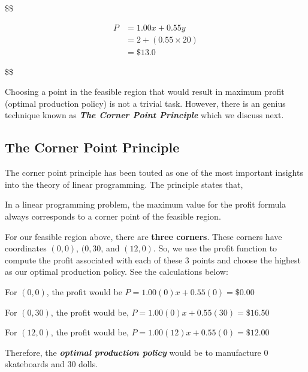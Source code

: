 \documentclass[
  letterpaper,
  DIV=11,
  numbers=noendperiod]{scrreprt}
\newenvironment{Shaded}{\begin{snugshade}}{\end{snugshade}}
\newcommand{\DataTypeTok}[1]{\textcolor[rgb]{0.68,0.00,0.00}{#1}}
\newcommand{\ErrorTok}[1]{\textcolor[rgb]{0.68,0.00,0.00}{#1}}
\newcommand{\KeywordTok}[1]{\textcolor[rgb]{0.00,0.23,0.31}{#1}}
\begin{document}
\$\$

\begin{align}
P&=1.00 x+0.55y\\
&=2+(0.55\times 20)\\
&=\$13.0
\end{align}

\$\$

Choosing a point in the feasible region that would result in maximum
profit (optimal production policy) is not a trivial task. However, there
is an genius technique known as \textbf{\emph{The Corner Point
Principle}} which we discuss next.

\hypertarget{the-corner-point-principle}{%
\subsection{The Corner Point
Principle}\label{the-corner-point-principle}}

The corner point principle has been touted as one of the most important
insights into the theory of linear programming. The principle states
that,

\begin{Shaded}
\begin{Highlighting}[]
\DataTypeTok{In} \DataTypeTok{a} \DataTypeTok{linear} \DataTypeTok{programming} \DataTypeTok{problem}\ErrorTok{,} \DataTypeTok{the} \DataTypeTok{maximum} \DataTypeTok{value} \DataTypeTok{for} \DataTypeTok{the} \DataTypeTok{profit} \DataTypeTok{formula} \DataTypeTok{always}
\DataTypeTok{corresponds} \DataTypeTok{to} \DataTypeTok{a} \DataTypeTok{corner} \DataTypeTok{point} \DataTypeTok{of} \DataTypeTok{the} \DataTypeTok{feasible} \DataTypeTok{region}\KeywordTok{.}
\end{Highlighting}
\end{Shaded}

For our feasible region above, there are \textbf{three corners}. These
corners have coordinates \((0,0)\), \((0,30\), and \((12,0)\). So, we
use the profit function to compute the profit associated with each of
these 3 points and choose the highest as our optimal production policy.
See the calculations below:

For \((0,0)\), the profit would be \(P=1.00 (0)x+0.55(0)=\$0.00\)

For \((0,30)\), the profit would be, \(P=1.00 (0)x+0.55(30)=\$16.50\)

For \((12,0)\), the profit would be, \(P=1.00 (12)x+0.55(0)=\$12.00\)

Therefore, the \textbf{\emph{optimal production policy}} would be to
manufacture 0 skateboards and 30 dolls.
\end{document}
